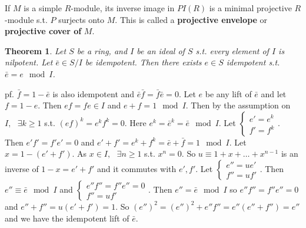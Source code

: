 \documentclass[12pt,letterpaper]{report}
\newtheorem{theorem}{Theorem}[section]
\begin{document}
If $M$ is a simple $R$-module, its inverse image in $PI(R)$ is a minimal projective $R$-module s.t. $P$ surjects onto $M$. This is called a \textbf{projective envelope}  or \textbf{projective cover of }$M$. 

\begin{theorem}Let $S$ be a ring, and $I$ be an ideal of $S$ s.t. every element of $I$ is nilpotent. Let $\bar{e}\in S/I$ be idempotent. Then there exists $e\in S$ idempotent s.t. $\bar{e}=e\mod I$.\end{theorem}
pf. $\bar{f}=1-\bar{e}$ is also idempotent and $\bar{e}\bar{f}=\bar{f}\bar{e}=0$. Let $e$ be any lift of $\bar{e}$ and let $f=1-e$. Then $ef=fe\in I$ and $e+f=1\mod I$. Then by the assumption on $I,\,\,\,\,\exists k\geq1$ s.t. $(ef)^{k}=e^{k}f^{k}=0$. Here $e^{k}=\bar{e}^{k}=\bar{e}\mod I$. Let $\left\{\begin{array}{r}e'=e^{k}\\f'=f^{k}\end{array}\right.$. Then $e'f'=f'e'=0$ and $e'+f'=e^{k}+f^{k}=\bar{e}+\bar{f}=1\mod I$. Let $x=1-(e'+f')$. As $x\in I,\,\,\,\,\exists n\geq1$ s.t. $x^{n}=0$. So $u\equiv 1+x+\dots+x^{n-1}$ is an inverse of $1-x=e'+f'$ and it commutes with $e',f'$. Let $\left\{\begin{array}{r}e''=ue'\\f''=uf'\end{array}\right.$. Then $e''\equiv\bar{e}\mod I$ and $\left\{\begin{array}{r}e''f''=f''e''=0\\f''=uf'\end{array}\right.$. Then $e''=\bar{e}\mod I$ so $e''f''=f''e''=0$ and $e''+f''=u(e'+f')=1$. So $(e'')^{2}=(e'')^{2}+e''f''=e''(e''+f'')=e''$ and we have the idempotent lift of $\bar{e}$. 
\end{document}
